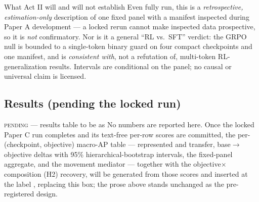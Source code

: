 \begin{takeaway}{What Act II will and will not establish}
Even fully run, this is a \emph{retrospective, estimation-only} description of one fixed panel with a
manifest inspected during Paper A development --- a locked rerun cannot make inspected data prospective, so
it is \emph{not} confirmatory. Nor is it a general ``RL vs.\ SFT'' verdict: the GRPO null is bounded to a
single-token binary guard on four compact checkpoints and one manifest, and is \emph{consistent with}, not
a refutation of, multi-token RL-generalization results. Intervals are conditional on the panel; no causal or
universal claim is licensed.
\end{takeaway}

\subsection{Results (pending the locked run)}
\label{sec:actII-results}

\begin{pending}{\textsc{pending} --- results table to be  as }
No numbers are reported here. Once the locked Paper C run completes and its text-free per-row scores are
committed, the per-(checkpoint, objective) macro-AP table --- represented and transfer, base$\to$objective
deltas with 95\% hierarchical-bootstrap intervals, the fixed-panel aggregate, and the movement mediator
--- together with the objective$\times$composition (H2) recovery, will be generated from those scores and
inserted at the label , replacing this box; the prose above stands unchanged as the
pre-registered design.
\end{pending}
